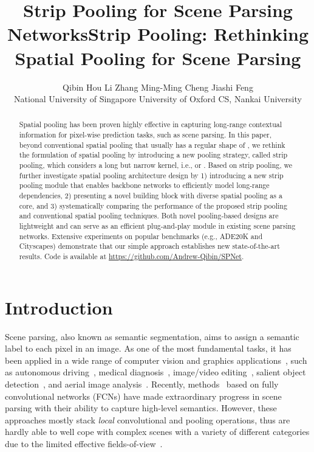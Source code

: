 \documentclass[final]{cvpr}
\begin{document}
\title{Strip Pooling for Scene Parsing Networks}
\title{Strip Pooling: Rethinking Spatial Pooling for Scene Parsing}


\author{Qibin Hou \qquad Li Zhang \qquad Ming-Ming Cheng \qquad Jiashi Feng \\
  National University of Singapore \qquad University of Oxford \qquad CS, Nankai University\\
}

\maketitle




\begin{abstract}
Spatial pooling has been proven highly effective in capturing long-range contextual information for pixel-wise prediction tasks, such as scene parsing.
In this paper, beyond conventional spatial pooling that usually has a regular shape of ,
we rethink the formulation of spatial pooling by introducing a new pooling strategy, called strip pooling,
which considers a long but narrow kernel, i.e.,  or .
Based on strip pooling, we further investigate spatial pooling architecture design by 
1) introducing a new strip pooling module that enables backbone networks to efficiently model long-range dependencies,
2) presenting a novel building block with diverse spatial pooling as a core, and 
3) systematically comparing the performance of the proposed strip pooling and conventional spatial pooling techniques.
Both novel pooling-based designs are lightweight and can serve as an efficient plug-and-play module in existing scene parsing networks.
Extensive experiments on popular benchmarks (e.g., ADE20K and Cityscapes)
demonstrate that our simple approach establishes new state-of-the-art results.
Code is available at \url{https://github.com/Andrew-Qibin/SPNet}.
\end{abstract}

\section{Introduction} \label{sec:introduction}

Scene parsing, also known as semantic segmentation, aims to assign a semantic label to each pixel in an image.
As one of the most fundamental tasks, it has been applied in a wide range of computer vision and graphics applications~\cite{ChengSurveyVM2017}, 
such as autonomous driving~\cite{teichmann2018multinet}, medical diagnosis~\cite{ronneberger2015u}, image/video editing~\cite{murali2019single,le2019object}, salient object detection~\cite{BorjiCVM2019}, and aerial image analysis~\cite{maggiori2017high}.
Recently, methods~\cite{long2015fully,chen2017deeplab} based on fully convolutional networks (FCNs) have made extraordinary progress in scene parsing with their ability to capture  high-level semantics.
However, these approaches mostly stack \textit{local} convolutional and pooling operations, thus are hardly able to well cope with complex scenes with a variety of different categories due to the limited effective fields-of-view~\cite{zhao2016pyramid,huang2018ccnet}.
\end{document}
